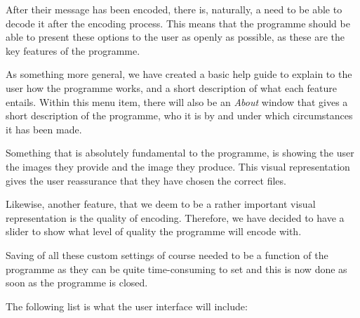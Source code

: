 After their message has been encoded, there is, naturally, a need to be able to decode it after the encoding process.
This means that the programme should be able to present these options to the user as openly as possible, as these are the key features of the programme.

As something more general, we have created a basic help guide to explain to the user how the programme works, and a short description of what each feature entails.
Within this menu item, there will also be an \textit{About} window that gives a short description of the programme, who it is by and under which circumstances it has been made.

Something that is absolutely fundamental to the programme, is showing the user the images they provide and the image they produce.
This visual representation gives the user reassurance that they have chosen the correct files.

Likewise, another feature, that we deem to be a rather important visual representation is the quality of encoding.
Therefore, we have decided to have a slider to show what level of quality the programme will encode with.

Saving of all these custom settings of course needed to be a function of the programme as they can be quite time-consuming to set and this is now done as soon as the programme is closed.

The following list is what the user interface will include:

